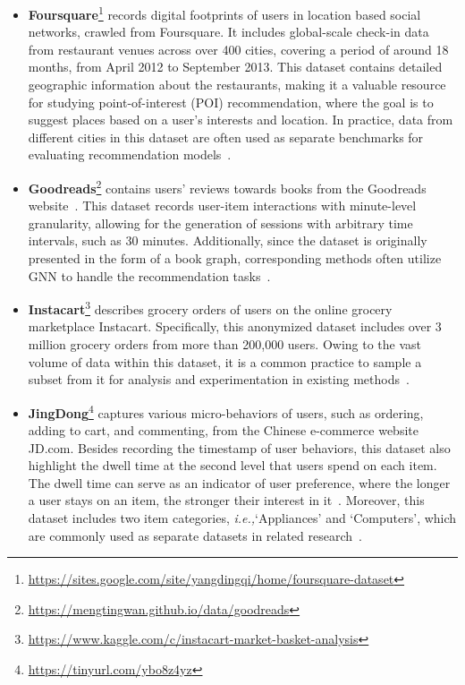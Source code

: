 \documentclass[lettersize,journal]{IEEEtran}
\newcommand{\ie}{\emph{i.e.,}\xspace}
\begin{document}
\begin{itemize}
    \item \textbf{Foursquare}\footnote{\url{https://sites.google.com/site/yangdingqi/home/foursquare-dataset}} records digital footprints of users in location based social networks, crawled from Foursquare. It includes global-scale check-in data from restaurant venues across over 400 cities, covering a period of around 18 months, from April 2012 to September 2013. This dataset contains detailed geographic information about the restaurants, making it a valuable resource for studying point-of-interest (POI) recommendation, where the goal is to suggest places based on a user’s interests and location. In practice, data from different cities in this dataset are often used as separate benchmarks for evaluating recommendation models~\cite{Caser,Lian@KDD2020,Wang@ICDE2022,Qin@WSDM2023}.

    \item \textbf{Goodreads}\footnote{\url{https://mengtingwan.github.io/data/goodreads}} contains users' reviews towards books from the Goodreads website~\cite{Wan@RecSys2018}. This dataset records user-item interactions with minute-level granularity, allowing for the generation of sessions with arbitrary time intervals, such as 30 minutes. Additionally, since the dataset is originally presented in the form of a book graph, corresponding methods often utilize GNN to handle the recommendation tasks~\cite{Zhang@IJCAI2022,Ma@AAAI2020,Li@CIKM2021}.

    \item \textbf{Instacart}\footnote{\url{https://www.kaggle.com/c/instacart-market-basket-analysis}} describes grocery orders of users on the online grocery marketplace Instacart. Specifically, this anonymized dataset includes over 3 million grocery orders from more than 200,000 users. Owing to the vast volume of data within this dataset, it is a common practice to sample a subset from it for analysis and experimentation in existing methods~\cite{qin@SIGIR2021,DIMO}.

    \item \textbf{JingDong}\footnote{\url{https://tinyurl.com/ybo8z4yz}} captures various micro-behaviors of users, such as ordering, adding to cart, and commenting, from the Chinese e-commerce website JD.com. Besides recording the timestamp of user behaviors, this dataset also highlight the dwell time at the second level that users spend on each item. The dwell time can serve as an indicator of user preference, where the longer a user stays on an item, the stronger their interest in it~\cite{Alexander@arXiv2017}. Moreover, this dataset includes two item categories, \ie `Appliances' and `Computers', which are commonly used as separate datasets in related research~\cite{Huang@WSDM2019,meng@SIGIR2020,Yuan@ICDE2022}.


\end{itemize}
\end{document}
